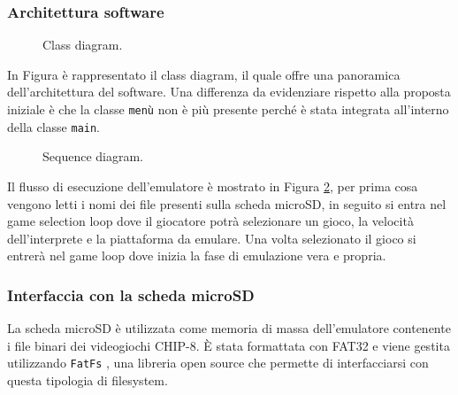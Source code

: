 \documentclass[a4paper]{article}
\begin{document}
\clearpage

\subsubsection{Architettura software}

\begin{figure}[h!t]
    \begin{center}
        \begin{tikzpicture}[scale=0.6, transform shape]
            
        \end{tikzpicture}
    \end{center}
    \caption{
       Class diagram.
    }
    \label{fig:class_diagram}
\end{figure}

In Figura \label{fig:class_diagram} è rappresentato il class diagram, il quale offre una panoramica
dell'architettura del software. Una differenza da evidenziare rispetto alla proposta iniziale
è che la classe \texttt{menù} non è più presente perché è stata integrata all'interno della
classe \texttt{main}.

\begin{figure}[h!t]
    \begin{center}
        
    \end{center}
    \caption{
        Sequence diagram.
    }
    \label{fig:sequence_diagram}
\end{figure}

Il flusso di esecuzione dell'emulatore è mostrato in Figura \ref{fig:sequence_diagram},
per prima cosa vengono letti i nomi dei file presenti sulla scheda microSD, in seguito
si entra nel game selection loop dove il giocatore potrà selezionare un gioco, la velocità
dell'interprete e la piattaforma da emulare. Una volta selezionato il gioco si entrerà nel
game loop dove inizia la fase di emulazione vera e propria.

\subsubsection{Interfaccia con la scheda microSD}\label{subsubsec:sd}

La scheda microSD è utilizzata come memoria di massa dell'emulatore contenente i file
binari dei videogiochi CHIP-8. È stata formattata con FAT32 e viene gestita utilizzando
\texttt{FatFs} \cite{elm-chan:fatfs}, una libreria open source che permette di
interfacciarsi con questa tipologia di filesystem.
\end{document}
